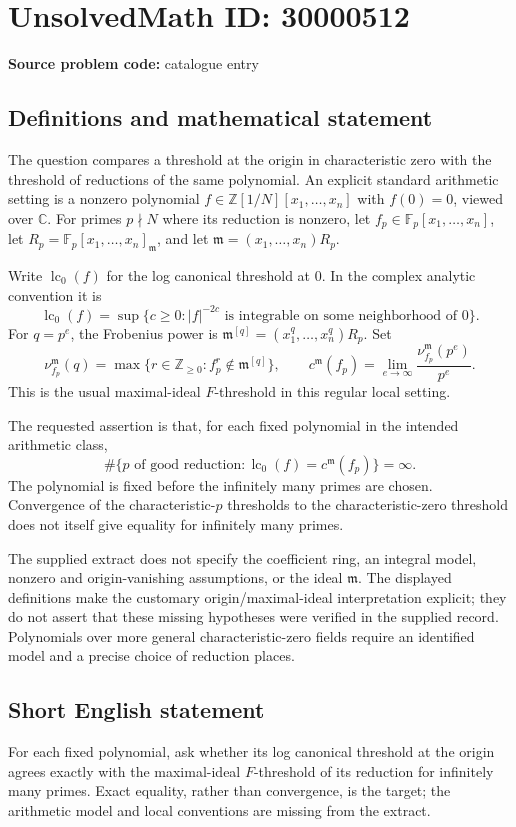 \documentclass[11pt]{article}
\newcommand{\Z}{\mathbb{Z}}
\newcommand{\C}{\mathbb{C}}
\newcommand{\F}{\mathbb{F}}
\begin{document}
\section*{UnsolvedMath ID: 30000512}
\textbf{Source problem code:} catalogue entry
\subsection{Definitions and mathematical statement}
The question compares a threshold at the origin in characteristic zero with the threshold of reductions of the same polynomial. An explicit standard arithmetic setting is a nonzero polynomial $f\in\Z[1/N][x_1,\ldots,x_n]$ with $f(0)=0$, viewed over $\C$. For primes $p\nmid N$ where its reduction is nonzero, let $f_p\in\F_p[x_1,\ldots,x_n]$, let $R_p=\F_p[x_1,\ldots,x_n]_{\mathfrak m}$, and let $\mathfrak m=(x_1,\ldots,x_n)R_p$.

Write $\operatorname{lc}_0(f)$ for the log canonical threshold at $0$. In the complex analytic convention it is
\[
\operatorname{lc}_0(f)=\sup\{c\geq0:|f|^{-2c}\text{ is integrable on some neighborhood of }0\}.
\]
For $q=p^e$, the Frobenius power is $\mathfrak m^{[q]}=(x_1^q,\ldots,x_n^q)R_p$. Set
\[
\nu_{f_p}^{\mathfrak m}(q)=\max\{r\in\Z_{\geq0}: f_p^r\notin\mathfrak m^{[q]}\},\qquad
c^{\mathfrak m}(f_p)=\lim_{e\to\infty}\frac{\nu_{f_p}^{\mathfrak m}(p^e)}{p^e}.
\]
This is the usual maximal-ideal $F$-threshold in this regular local setting.

The requested assertion is that, for each fixed polynomial in the intended arithmetic class,
\[
\#\{p\text{ of good reduction}:\operatorname{lc}_0(f)=c^{\mathfrak m}(f_p)\}=\infty.
\]
The polynomial is fixed before the infinitely many primes are chosen. Convergence of the characteristic-$p$ thresholds to the characteristic-zero threshold does not itself give equality for infinitely many primes.

The supplied extract does not specify the coefficient ring, an integral model, nonzero and origin-vanishing assumptions, or the ideal $\mathfrak m$. The displayed definitions make the customary origin/maximal-ideal interpretation explicit; they do not assert that these missing hypotheses were verified in the supplied record. Polynomials over more general characteristic-zero fields require an identified model and a precise choice of reduction places.
\subsection{Short English statement}
For each fixed polynomial, ask whether its log canonical threshold at the origin agrees exactly with the maximal-ideal $F$-threshold of its reduction for infinitely many primes. Exact equality, rather than convergence, is the target; the arithmetic model and local conventions are missing from the extract.
\end{document}

